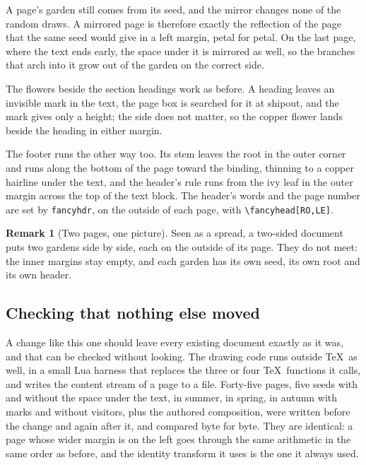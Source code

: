 \documentclass[11pt,a4paper,twoside]{article}
\newcommand\code[1]{\texttt{\small #1}}
\theoremstyle{definition}
\newtheorem*{remark}{Remark}
\begin{document}
A page's garden still comes from its seed, and the mirror changes none of the random
draws. A mirrored page is therefore exactly the reflection of the page that the same seed
would give in a left margin, petal for petal. On the last page, where the text ends early,
the space under it is mirrored as well, so the branches that arch into it grow out of the
garden on the correct side.

The flowers beside the section headings work as before. A heading leaves an invisible mark
in the text, the page box is searched for it at shipout, and the mark gives only a height;
the side does not matter, so the copper flower lands beside the heading in either margin.

The footer runs the other way too. Its stem leaves the root in the outer corner and
runs along the bottom of the page toward the binding, thinning to a copper hairline under
the text, and the header's rule runs from the ivy leaf in the outer margin across the top
of the text block. The header's words and the page number are set by \code{fancyhdr}, on
the outside of each page, with \code{\textbackslash fancyhead[RO,LE]}.

\begin{remark}[Two pages, one picture]
Seen as a spread, a two-sided document puts two gardens side by side, each on the outside
of its page. They do not meet: the inner margins stay empty, and each garden has its own
seed, its own root and its own header.
\end{remark}

\subsection{Checking that nothing else moved}

A change like this one should leave every existing document exactly as it was, and that
can be checked without looking. The drawing code runs outside \TeX\ as well, in a small
Lua harness that replaces the three or four \TeX\ functions it calls, and writes the
content stream of a page to a file. Forty-five pages, five seeds with and without the space
under the text, in summer, in spring, in autumn with marks and without visitors, plus the
authored composition, were written before the change and again after it, and compared
byte for byte. They are identical: a page whose wider margin is on the left goes through
the same arithmetic in the same order as before, and the identity transform it uses is
the one it always used.
\end{document}
